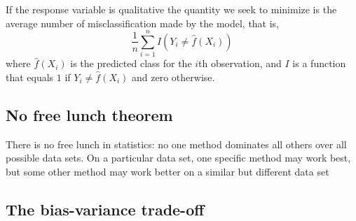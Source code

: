 If the response variable is qualitative the quantity we seek to minimize is the average number of misclassification made by the model, that is,
\[
    \frac{1}{n} \sum_{i=1}^n I \left( Y_i \neq \hat{f}(X_i) \right)
\]
where $\hat{f}(X_i)$ is the predicted class for the $i$th observation, and $I$ is a function that equals $1$ if $Y_i \neq \hat{f}(X_i)$ and zero otherwise.

\subsection{No free lunch theorem}

{\color{red} There is no free lunch in statistics: no one method dominates all others over all possible data sets. On a particular data set, one specific method may work best, but some other method may work better on a similar but different data set}

\subsection{The bias-variance trade-off}


